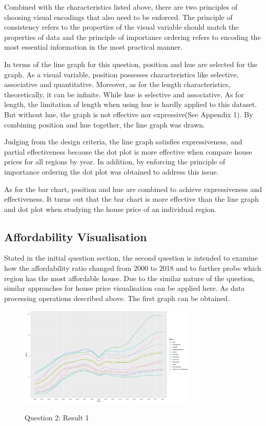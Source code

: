\documentclass{article}
\begin{document}
Combined with the characteristics listed above, there are two principles of choosing visual encodings that also need to be enforced. The principle of consistency refers to the properties of the visual variable should match 
the properties of data and the principle of importance ordering refers to encoding the most essential information 
in the most practical manner.

In terms of the line graph for this question, position and hue are selected for the graph. As a visual variable, 
position possesses characteristics like selective, associative and quantitative. Moreover, as for the length characteristics, theoretically, it can be infinite. While hue is selective and associative. As for length, 
the limitation of length when using hue is hardly applied to this dataset. But without hue, the graph is not effective nor expressive(See Appendix 1). By combining position and hue together, the line graph was drawn. 

Judging from the design criteria, the line graph satisfies expressiveness, and partial effectiveness because the dot plot is more effective when compare house prices for all regions by year. In addition, by enforcing 
the principle of importance ordering the dot plot was obtained to address this issue.

As for the bar chart, position and hue are combined to achieve expressiveness and effectiveness. It turns out 
that the bar chart is more effective than the line graph and dot plot when studying the house price of an individual region.




\subsection{Affordability Visualisation}
Stated in the initial question section, the second question is intended to examine how the affordability ratio changed from 2000 to 2018 
and to further probe which region has the most affordable house. Due to the similar nature of the question, 
similar approaches for house price visualisation can be applied here. As data processing operations described above. 
The first graph can be obtained.

\begin{figure}[H]
  \begin{minipage}[b]{1.0\linewidth}
    \centering
    \centerline{\includegraphics[width=8.5cm]{Q2Geom_line}}
    \centerline{Question 2: Result 1}\medskip
  \end{minipage}
\end{figure}
\end{document}
